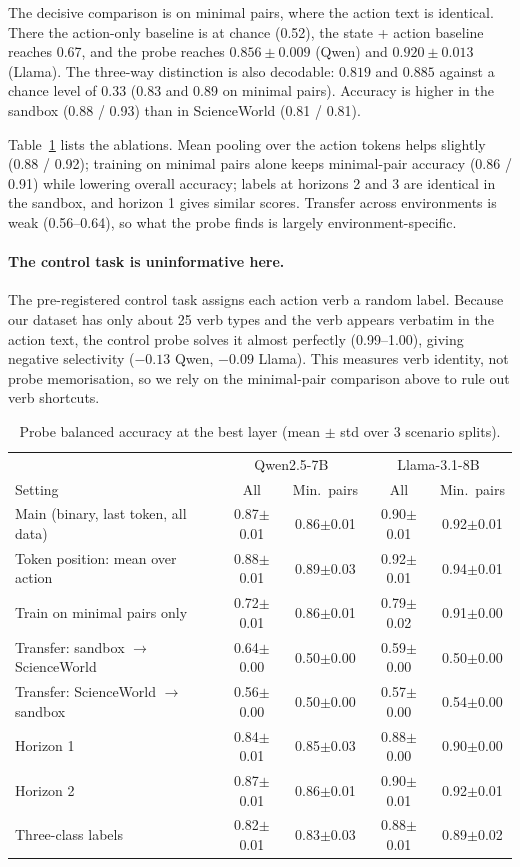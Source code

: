 \documentclass[11pt]{article}
\begin{document}
The decisive comparison is on minimal pairs, where the action text is identical. There the action-only baseline is
at chance (0.52), the state + action baseline reaches 0.67, and the probe reaches $0.856\pm0.009$ (Qwen) and
$0.920\pm0.013$ (Llama). The three-way distinction is also decodable: $0.819$ and $0.885$ against a chance level of
0.33 (0.83 and 0.89 on minimal pairs). Accuracy is higher in the sandbox (0.88 / 0.93) than in ScienceWorld
(0.81 / 0.81).

Table~\ref{tab:ablation} lists the ablations. Mean pooling over the action tokens helps slightly (0.88 / 0.92);
training on minimal pairs alone keeps minimal-pair accuracy (0.86 / 0.91) while lowering overall accuracy; labels
at horizons 2 and 3 are identical in the sandbox, and horizon 1 gives similar scores. Transfer across environments
is weak (0.56--0.64), so what the probe finds is largely environment-specific.

\paragraph{The control task is uninformative here.} The pre-registered control task assigns each action verb a
random label. Because our dataset has only about 25 verb types and the verb appears verbatim in the action text, the
control probe solves it almost perfectly (0.99--1.00), giving negative selectivity ($-0.13$ Qwen, $-0.09$ Llama).
This measures verb identity, not probe memorisation, so we rely on the minimal-pair comparison above to rule out
verb shortcuts.

\begin{table}[t]
\centering\small
\begin{tabular}{lcccc}
\toprule
 & \multicolumn{2}{c}{Qwen2.5-7B} & \multicolumn{2}{c}{Llama-3.1-8B} \\
Setting & All & Min.\ pairs & All & Min.\ pairs \\
\midrule
Main (binary, last token, all data) & 0.87$\pm$0.01 & 0.86$\pm$0.01 & 0.90$\pm$0.01 & 0.92$\pm$0.01 \\
Token position: mean over action & 0.88$\pm$0.01 & 0.89$\pm$0.03 & 0.92$\pm$0.01 & 0.94$\pm$0.01 \\
Train on minimal pairs only & 0.72$\pm$0.01 & 0.86$\pm$0.01 & 0.79$\pm$0.02 & 0.91$\pm$0.00 \\
Transfer: sandbox $\rightarrow$ ScienceWorld & 0.64$\pm$0.00 & 0.50$\pm$0.00 & 0.59$\pm$0.00 & 0.50$\pm$0.00 \\
Transfer: ScienceWorld $\rightarrow$ sandbox & 0.56$\pm$0.00 & 0.50$\pm$0.00 & 0.57$\pm$0.00 & 0.54$\pm$0.00 \\
Horizon 1 & 0.84$\pm$0.01 & 0.85$\pm$0.03 & 0.88$\pm$0.00 & 0.90$\pm$0.00 \\
Horizon 2 & 0.87$\pm$0.01 & 0.86$\pm$0.01 & 0.90$\pm$0.01 & 0.92$\pm$0.01 \\
Three-class labels & 0.82$\pm$0.01 & 0.83$\pm$0.03 & 0.88$\pm$0.01 & 0.89$\pm$0.02 \\
\bottomrule
\end{tabular}
\caption{Probe balanced accuracy at the best layer (mean $\pm$ std over 3 scenario splits).}
\label{tab:ablation}
\end{table}
\end{document}
